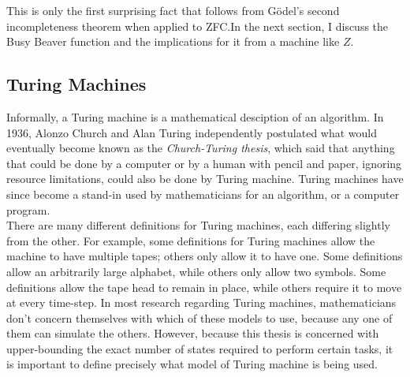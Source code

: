 \documentclass[11pt]{article}
\begin{document}
This is only the first surprising fact that follows from G\"{o}del's second incompleteness theorem when applied to ZFC.\footnotemark In the next section, I discuss the Busy Beaver function and the implications for it from a machine like $Z$.

\subsection{Turing Machines \label{sec:tm}}

Informally, a Turing machine is a mathematical desciption of an algorithm. In 1936, Alonzo Church and Alan Turing independently postulated what would eventually become known as the \emph{Church-Turing thesis}, which said that anything that could be done by a computer or by a human with pencil and paper, ignoring resource limitations, could also be done by Turing machine. Turing machines have since become a stand-in used by mathematicians for an algorithm, or a computer program. \\

There are many different definitions for Turing machines, each differing slightly from the other. For example, some definitions for Turing machines allow the machine to have multiple tapes; others only allow it to have one. Some definitions allow an arbitrarily large alphabet, while others only allow two symbols. Some definitions allow the tape head to remain in place, while others require it to move at every time-step. In most research regarding Turing machines, mathematicians don't concern themselves with which of these models to use, because any one of them can simulate the others. However, because this thesis is concerned with upper-bounding the exact number of states required to perform certain tasks, it is important to define precisely what model of Turing machine is being used. \\
\end{document}
